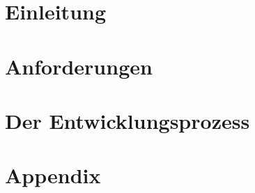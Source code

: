 







\part{Einleitung}




\part{Anforderungen}



\part{Der Entwicklungsprozess}



\appendix
\part{Appendix} %


